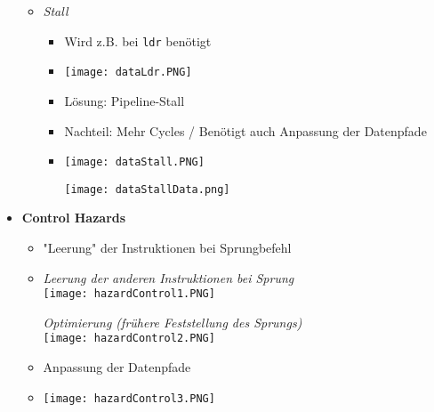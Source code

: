 \begin{itemize}
\begin{itemize}
                \item \textit{Stall}
                    \begin{itemize}
                        \item Wird z.B. bei \texttt{ldr} benötigt
                        \item[] \texttt{[image: dataLdr.PNG]}
                        \item Lösung: Pipeline-Stall
                        \item Nachteil: Mehr Cycles / Benötigt auch Anpassung der Datenpfade
                        \item[]
                            \begin{minipage}{0.45\textwidth}
                                \texttt{[image: dataStall.PNG]}
                            \end{minipage}
                            \begin{minipage}{0.45\textwidth}
                                \texttt{[image: dataStallData.png]}
                            \end{minipage}
                    \end{itemize}
            \end{itemize}
        
        \item \textbf{Control Hazards}
            \begin{itemize}
                \item \string"Leerung\string" der Instruktionen bei Sprungbefehl
                \item[]
                    \begin{minipage}{0.45\textwidth}
                        \textit{Leerung der anderen Instruktionen bei Sprung} \\
                        \texttt{[image: hazardControl1.PNG]}
                    \end{minipage}
                    \begin{minipage}{0.45\textwidth}
                        \textit{Optimierung (frühere Feststellung des Sprungs)} \\
                        \texttt{[image: hazardControl2.PNG]}
                    \end{minipage}
                \item Anpassung der Datenpfade
                \item[] \texttt{[image: hazardControl3.PNG]}
            \end{itemize}
    \end{itemize}


